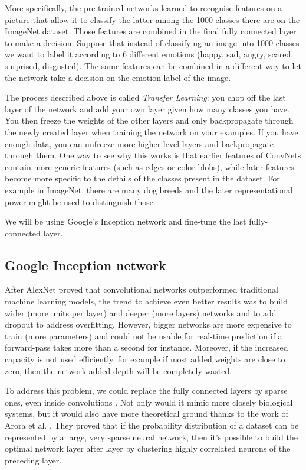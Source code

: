 More specifically, the pre-trained networks learned to recognise features on a picture that allow it to classify the latter among the 1000 classes there are on the ImageNet dataset. Those features are combined in the final fully connected layer to make a decision. Suppose that instead of classifying an image into 1000 classes we want to label it according to 6 different emotions (happy, sad, angry, scared, surprised, disgusted). The same features can be combined in a different way to let the network take a decision on the emotion label of the image.

The process described above is called {\em Transfer Learning}: you chop off the last layer of the network and add your own layer given how many classes you have. You then freeze the weights of the other layers and only backpropagate through the newly created layer when training the network on your examples. If you have enough data, you can unfreeze more higher-level layers and backpropagate through them. One way to see why this works is that earlier features of ConvNets contain more generic features (such as edges or color blobs), while later features become more specific to the details of the classes present in the dataset. For example in ImageNet, there are many dog breeds and the later representational power might be used to distinguish those \cite{transfer}.

We will be using Google's Inception network and fine-tune the last fully-connected layer.

\subsection{Google Inception network}
After AlexNet proved that convolutional networks outperformed traditional machine learning models, the trend to achieve even better results was to build wider (more units per layer) and deeper (more layers) networks and to add dropout to address overfitting. However, bigger networks are more expensive to train (more parameters) and could not be usable for real-time prediction if a forward-pass takes more than a second for instance. Moreover, if the increased capacity is not used efficiently, for example if most added weights are close to zero, then the network added depth will be completely wasted.

To address this problem, we could replace the fully connected layers by sparse ones, even inside convolutions \cite{googlenet}. Not only would it mimic more closely biological systems, but it would also have more theoretical ground thanks to the work of Arora et al. \cite{arora}. They proved that if the probability distribution of a dataset can be represented by a large, very sparse neural network, then it's possible to build the optimal network layer after layer by clustering highly correlated neurons of the preceding layer.

